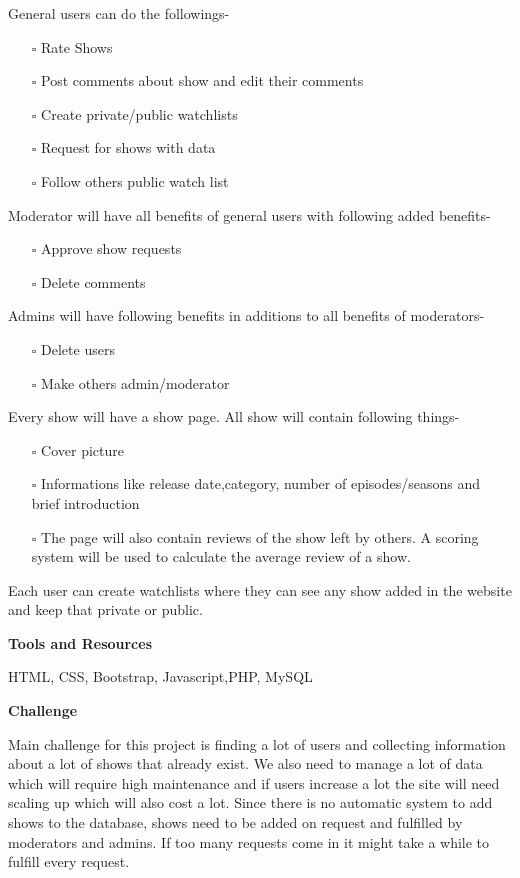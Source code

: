 \documentclass[]{article}
\begin{document}
General users can do the followings-

\begin{itemize}
\item[$\square$]
  Rate Shows
\item[$\square$]
  Post comments about show and edit their comments
\item[$\square$]
  Create private/public watchlists
\item[$\square$]
  Request for shows with data
\item[$\square$]
  Follow others public watch list
\end{itemize}

Moderator will have all benefits of general users with following added
benefits-

\begin{itemize}
\item[$\square$]
  Approve show requests
\item[$\square$]
  Delete comments
\end{itemize}

Admins will have following benefits in additions to all benefits of
moderators-

\begin{itemize}
\item[$\square$]
  Delete users
\item[$\square$]
  Make others admin/moderator
\end{itemize}

Every show will have a show page. All show will contain following
things-

\begin{itemize}
\item[$\square$]
  Cover picture
\item[$\square$]
  Informations like release date,category, number of episodes/seasons
  and brief introduction
\item[$\square$]
  The page will also contain reviews of the show left by others. A
  scoring system will be used to calculate the average review of a show.
\end{itemize}

Each user can create watchlists where they can see any show added in the
website and keep that private or public.

\textbf{Tools and Resources}

HTML, CSS, Bootstrap, Javascript,PHP, MySQL

\textbf{Challenge}

Main challenge for this project is finding a lot of users and collecting
information about a lot of shows that already exist. We also need to
manage a lot of data which will require high maintenance and if users
increase a lot the site will need scaling up which will also cost a lot.
Since there is no automatic system to add shows to the database, shows
need to be added on request and fulfilled by moderators and admins. If
too many requests come in it might take a while to fulfill every
request.
\end{document}
